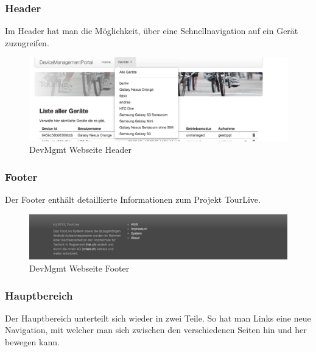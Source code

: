 \subsubsection{Header}
Im Header hat man die Möglichkeit, über eine Schnellnavigation auf ein Gerät zuzugreifen. 
\begin{figure}[H]
	\centering
	\includegraphics[width=120mm]{images/devmgmtsrv/header.png}
	\caption{DevMgmt Webseite Header}
\end{figure}



\subsubsection{Footer}
Der Footer enthält detaillierte Informationen zum Projekt TourLive. 
 
\begin{figure}[H]
	\centering
	\includegraphics[width=120mm]{images/devmgmtsrv/footer.png}
	\caption{DevMgmt Webseite Footer}
\end{figure}


\subsubsection{Hauptbereich}
Der Hauptbereich unterteilt sich wieder in zwei Teile. So hat man Links eine neue Navigation, mit welcher man sich zwischen den verschiedenen Seiten hin und her bewegen kann. 
 

